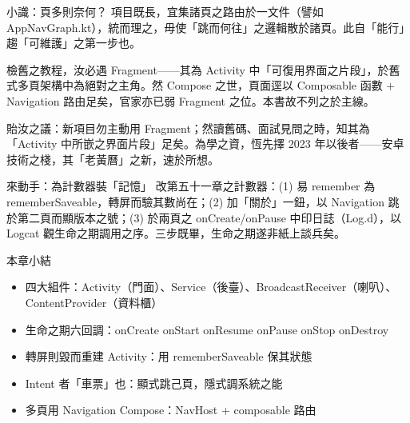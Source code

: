 \begin{tcbinfo}{小識：頁多則奈何？}
項目既長，宜集諸頁之路由於一文件（譬如 AppNavGraph.kt），統而理之，毋使「跳而何往」之邏輯散於諸頁。此自「能行」趨「可維護」之第一步也。

\end{tcbinfo}


檢舊之教程，汝必遇 Fragment——其為 Activity 中「可復用界面之片段」，於舊式多頁架構中為絕對之主角。然 Compose 之世，頁面逕以 Composable 函數 + Navigation 路由足矣，官家亦已弱 Fragment 之位。本書故不列之於主線。

貽汝之議：新項目勿主動用 Fragment；然讀舊碼、面試見問之時，知其為「Activity 中所嵌之界面片段」足矣。為學之資，恆先擇 2023 年以後者——安卓技術之棧，其「老黃曆」之新，速於所想。

\begin{tcbpractice}{來動手：為計數器裝「記憶」}
改第五十一章之計數器：(1) 易 remember 為 rememberSaveable，轉屏而驗其數尚在；(2) 加「關於」一鈕，以 Navigation 跳於第二頁而顯版本之號；(3) 於兩頁之 onCreate/onPause 中印日誌（Log.d），以 Logcat 觀生命之期調用之序。三步既畢，生命之期遂非紙上談兵矣。

\end{tcbpractice}

\begin{tcbsummary}{本章小結}
\begin{itemize}
  \item 四大組件：Activity（門面）、Service（後臺）、BroadcastReceiver（喇叭）、ContentProvider（資料櫃）
  \item 生命之期六回調：onCreate onStart onResume onPause onStop onDestroy
  \item 轉屏則毀而重建 Activity：用 rememberSaveable 保其狀態
  \item Intent 者「車票」也：顯式跳己頁，隱式調系統之能
  \item 多頁用 Navigation Compose：NavHost + composable 路由
\end{itemize}

\end{tcbsummary}
